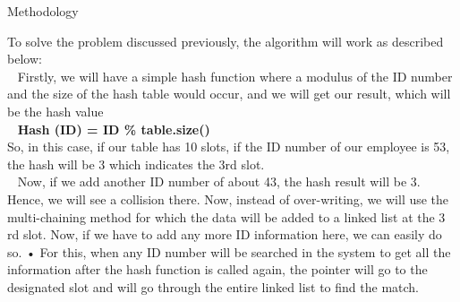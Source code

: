 \documentclass[final]{beamer}
\newlength{\colwidth}
\begin{document}
\begin{frame}[t]
\begin{columns}[t]
\begin{column}{\colwidth}
			\begin{alertblock}{Methodology}   
                \begin{multicols}{2}
                 To solve the problem discussed previously, the algorithm will work as described below:\\ 
Firstly, we will have a simple hash function where a modulus of the ID number and the size of the hash table would occur, and we will get our result, which will be the hash value\\ 
\textbf{Hash (ID) = ID \% table.size()~}\\
So, in this case, if our table has 10 slots, if the ID number of our employee is 53, the hash will be 3 which indicates the 3rd slot.\\ 
Now, if we add another ID number of about 43, the hash result will be 3. Hence, we will see a collision there. Now, instead of over-writing, we will use the multi-chaining method for which the data will be added to a linked list at the 3 rd slot.
Now, if we have to add any more ID information here, we can easily do so. • For this, when any ID number will be searched in the system to get all the information after the hash function is called again, the pointer will go to the designated slot and will go through the entire linked list
to find the match.
\columnbreak
\begin{figure}
    \centering

\end{figure}
\end{multicols}
\end{alertblock}
\end{column}
\end{columns}
\end{frame}
\end{document}
